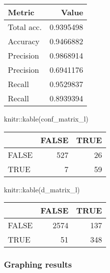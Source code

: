\documentclass[
]{article}
\newenvironment{Shaded}{\begin{snugshade}}{\end{snugshade}}
\newcommand{\FunctionTok}[1]{\textcolor[rgb]{0.00,0.00,0.00}{#1}}
\newcommand{\NormalTok}[1]{#1}
\newcommand{\SpecialCharTok}[1]{\textcolor[rgb]{0.00,0.00,0.00}{#1}}
\begin{document}
\begin{longtable}[]{@{}lr@{}}
\toprule
Metric & Value \\
\midrule
\endhead
Total acc. & 0.9395498 \\
Accuracy & 0.9466882 \\
Precision & 0.9868914 \\
Precision & 0.6941176 \\
Recall & 0.9529837 \\
Recall & 0.8939394 \\
\bottomrule
\end{longtable}

\begin{Shaded}
\begin{Highlighting}[]
\NormalTok{knitr}\SpecialCharTok{::}\FunctionTok{kable}\NormalTok{(conf\_matrix\_l)}
\end{Highlighting}
\end{Shaded}

\begin{longtable}[]{@{}lrr@{}}
\toprule
& FALSE & TRUE \\
\midrule
\endhead
FALSE & 527 & 26 \\
TRUE & 7 & 59 \\
\bottomrule
\end{longtable}

\begin{Shaded}
\begin{Highlighting}[]
\NormalTok{knitr}\SpecialCharTok{::}\FunctionTok{kable}\NormalTok{(d\_matrix\_l)}
\end{Highlighting}
\end{Shaded}

\begin{longtable}[]{@{}lrr@{}}
\toprule
& FALSE & TRUE \\
\midrule
\endhead
FALSE & 2574 & 137 \\
TRUE & 51 & 348 \\
\bottomrule
\end{longtable}

\hypertarget{graphing-results-1}{%
\subsubsection{Graphing results}\label{graphing-results-1}}
\end{document}
